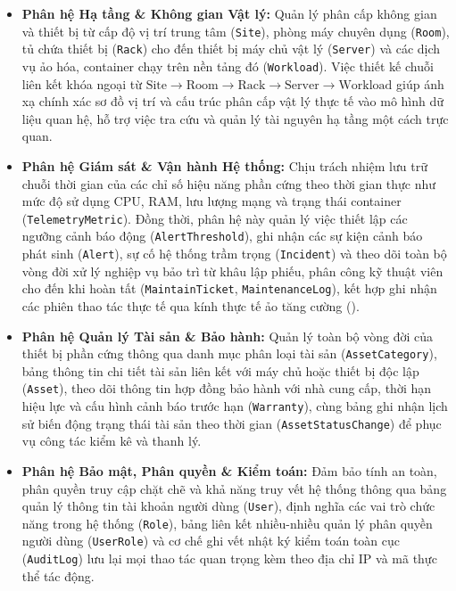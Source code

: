 \begin{itemize}[leftmargin=2em]
    \item \textbf{Phân hệ Hạ tầng \& Không gian Vật lý:} 
    Quản lý phân cấp không gian và thiết bị từ cấp độ vị trí trung tâm (\texttt{Site}), phòng máy chuyên dụng (\texttt{Room}), tủ chứa thiết bị (\texttt{Rack}) cho đến thiết bị máy chủ vật lý (\texttt{Server}) và các dịch vụ ảo hóa, container chạy trên nền tảng đó (\texttt{Workload}). Việc thiết kế chuỗi liên kết khóa ngoại từ $\text{Site} \to \text{Room} \to \text{Rack} \to \text{Server} \to \text{Workload}$ giúp ánh xạ chính xác sơ đồ vị trí và cấu trúc phân cấp vật lý thực tế vào mô hình dữ liệu quan hệ, hỗ trợ việc tra cứu và quản lý tài nguyên hạ tầng một cách trực quan.

    \item \textbf{Phân hệ Giám sát \& Vận hành Hệ thống:} 
    Chịu trách nhiệm lưu trữ chuỗi thời gian của các chỉ số hiệu năng phần cứng theo thời gian thực như mức độ sử dụng CPU, RAM, lưu lượng mạng và trạng thái container (\texttt{TelemetryMetric}). Đồng thời, phân hệ này quản lý việc thiết lập các ngưỡng cảnh báo động (\texttt{AlertThreshold}), ghi nhận các sự kiện cảnh báo phát sinh (\texttt{Alert}), sự cố hệ thống trầm trọng (\texttt{Incident}) và theo dõi toàn bộ vòng đời xử lý nghiệp vụ bảo trì từ khâu lập phiếu, phân công kỹ thuật viên cho đến khi hoàn tất (\texttt{MaintainTicket}, \texttt{MaintenanceLog}), kết hợp ghi nhận các phiên thao tác thực tế qua kính thực tế ảo tăng cường ().

    \item \textbf{Phân hệ Quản lý Tài sản \& Bảo hành:} 
    Quản lý toàn bộ vòng đời của thiết bị phần cứng thông qua danh mục phân loại tài sản (\texttt{AssetCategory}), bảng thông tin chi tiết tài sản liên kết với máy chủ hoặc thiết bị độc lập (\texttt{Asset}), theo dõi thông tin hợp đồng bảo hành với nhà cung cấp, thời hạn hiệu lực và cấu hình cảnh báo trước hạn (\texttt{Warranty}), cùng bảng ghi nhận lịch sử biến động trạng thái tài sản theo thời gian (\texttt{AssetStatusChange}) để phục vụ công tác kiểm kê và thanh lý.

    \item \textbf{Phân hệ Bảo mật, Phân quyền \& Kiểm toán:} 
    Đảm bảo tính an toàn, phân quyền truy cập chặt chẽ và khả năng truy vết hệ thống thông qua bảng quản lý thông tin tài khoản người dùng (\texttt{User}), định nghĩa các vai trò chức năng trong hệ thống (\texttt{Role}), bảng liên kết nhiều-nhiều quản lý phân quyền người dùng (\texttt{UserRole}) và cơ chế ghi vết nhật ký kiểm toán toàn cục (\texttt{AuditLog}) lưu lại mọi thao tác quan trọng kèm theo địa chỉ IP và mã thực thể tác động.
\end{itemize}

